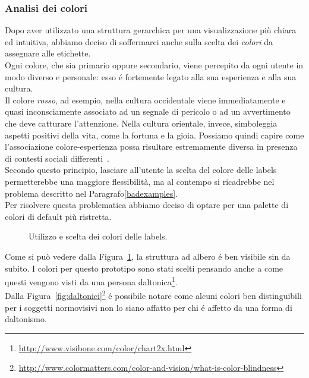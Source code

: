\documentclass[12pt]{article} %
\begin{document}
\subsubsection{Analisi dei colori}
Dopo aver utilizzato una struttura gerarchica per una visualizzazione pi\`u chiara ed intuitiva, abbiamo deciso di soffermarci anche sulla scelta dei \emph{colori} da assegnare alle etichette.\\
Ogni colore, che sia primario oppure secondario, viene percepito da ogni utente in modo diverso e personale: esso \'e fortemente legato alla sua esperienza e alla sua cultura.\\
Il colore \emph{rosso}, ad esempio, nella cultura occidentale viene immediatamente e quasi inconsciamente associato ad un segnale di pericolo o ad un avvertimento che deve catturare l'attenzione. Nella cultura orientale, invece, simboleggia aspetti positivi della vita, come la fortuna e la gioia. Possiamo quindi capire come l'associazione colore-esperienza possa risultare estremamente diversa in presenza di contesti sociali differenti~\cite[p.~9-12]{thesis}.\\
Secondo questo principio, lasciare all'utente la scelta del colore delle labels permetterebbe una maggiore flessibilit\`a, ma al contempo si ricadrebbe nel problema descritto nel Paragrafo\ref{badexamples}.\\
Per risolvere questa problematica abbiamo deciso di optare per una palette di colori di default pi\`u ristretta.

\begin{figure}[H]
\caption{Utilizzo e scelta dei colori delle labels.}
\label{fig:finale}
\end{figure}

Come si pu\`o vedere dalla Figura~\ref{fig:finale}, la struttura ad albero \'e ben visibile sin da subito. I colori per questo prototipo sono stati scelti pensando anche a come questi vengono visti da una persona daltonica\footnote{\url{http://www.visibone.com/color/chart2x.html}}.\\
Dalla Figura~\ref{fig:daltonici}\footnote{\url{http://www.colormatters.com/color-and-vision/what-is-color-blindness}} \'e possibile notare come alcuni colori ben distinguibili per i soggetti normovisivi non lo siano affatto per chi \'e affetto da una forma di daltonismo.
\end{document}
